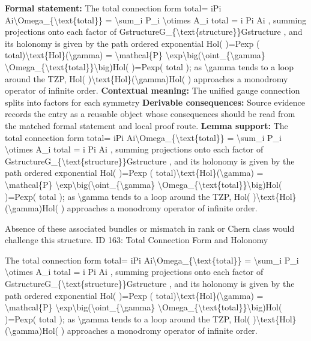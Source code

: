 \begingroup\footnotesize\setlength{\emergencystretch}{3em}\sloppy
\textbf{Formal statement:} The total connection form  total= iPi Ai\textbackslash{}Omega\_\{\textbackslash{}text\{total\}\} = \textbackslash{}sum\_i P\_i \textbackslash{}otimes A\_i total = i Pi  Ai , summing projections onto each factor of GstructureG\_\{\textbackslash{}text\{structure\}\}Gstructure , and its holonomy is given by the path ordered exponential Hol( )=Pexp (   total)\textbackslash{}text\{Hol\}(\textbackslash{}gamma) = \textbackslash{}mathcal\{P\} \textbackslash{}exp\textbackslash{}big(\textbackslash{}oint\_\{\textbackslash{}gamma\} \textbackslash{}Omega\_\{\textbackslash{}text\{total\}\}\textbackslash{}big)Hol( )=Pexp(    total ); as  \textbackslash{}gamma  tends to a loop around the TZP, Hol( )\textbackslash{}text\{Hol\}(\textbackslash{}gamma)Hol( ) approaches a monodromy operator of infinite order.
\textbf{Contextual meaning:} The unified gauge connection splits into factors for each symmetry
\textbf{Derivable consequences:} Source evidence records the entry as a reusable object whose consequences should be read from the matched formal statement and local proof route.
\textbf{Lemma support:} The total connection form  total= iPi Ai\textbackslash{}Omega\_\{\textbackslash{}text\{total\}\} = \textbackslash{}sum\_i P\_i \textbackslash{}otimes A\_i total = i Pi  Ai , summing projections onto each factor of GstructureG\_\{\textbackslash{}text\{structure\}\}Gstructure , and its holonomy is given by the path ordered exponential Hol( )=Pexp (   total)\textbackslash{}text\{Hol\}(\textbackslash{}gamma) = \textbackslash{}mathcal\{P\} \textbackslash{}exp\textbackslash{}big(\textbackslash{}oint\_\{\textbackslash{}gamma\} \textbackslash{}Omega\_\{\textbackslash{}text\{total\}\}\textbackslash{}big)Hol( )=Pexp(    total ); as  \textbackslash{}gamma  tends to a loop around the TZP, Hol( )\textbackslash{}text\{Hol\}(\textbackslash{}gamma)Hol( ) approaches a monodromy operator of infinite order.\par
\endgroup

Absence of these associated bundles or mismatch in rank or Chern class would challenge this structure. ID 163: Total Connection Form and Holonomy

The total connection form  total= iPi Ai\textbackslash{}Omega\_\{\textbackslash{}text\{total\}\} = \textbackslash{}sum\_i P\_i \textbackslash{}otimes A\_i total = i Pi  Ai , summing projections onto each factor of GstructureG\_\{\textbackslash{}text\{structure\}\}Gstructure , and its holonomy is given by the path ordered exponential Hol( )=Pexp (   total)\textbackslash{}text\{Hol\}(\textbackslash{}gamma) = \textbackslash{}mathcal\{P\} \textbackslash{}exp\textbackslash{}big(\textbackslash{}oint\_\{\textbackslash{}gamma\} \textbackslash{}Omega\_\{\textbackslash{}text\{total\}\}\textbackslash{}big)Hol( )=Pexp(    total ); as  \textbackslash{}gamma  tends to a loop around the TZP, Hol( )\textbackslash{}text\{Hol\}(\textbackslash{}gamma)Hol( ) approaches a monodromy operator of infinite order.


